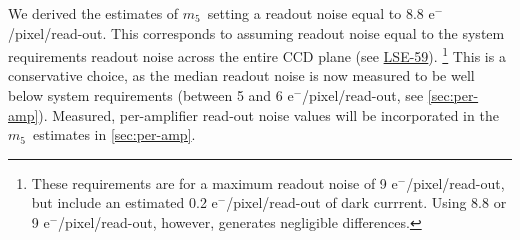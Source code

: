 \documentclass[PST,authoryear,toc]{lsstdoc}
\newcommand{\mf}{\ensuremath{m_5}}
\begin{document}
We derived the estimates of \mf\ setting a readout noise equal to 8.8  e$^-$/pixel/read-out. This corresponds to assuming readout noise equal to the system requirements readout noise across the entire CCD plane (see \href{https://docushare.lsst.org/docushare/dsweb/Get/LSE-59}{{LSE-59}}). \footnote{
These requirements are for a maximum readout noise of 9 e$^-$/pixel/read-out, but include an estimated 0.2  e$^-$/pixel/read-out of dark currrent. Using 8.8 or 9 e$^-$/pixel/read-out, however, generates negligible differences.}
This is a conservative choice, as the median readout noise is now measured to be well below system requirements (between 5 and 6  e$^-$/pixel/read-out, see \autoref{sec:per-amp}). Measured, per-amplifier read-out noise values will be incorporated in the \mf\ estimates in \autoref{sec:per-amp}.
\end{document}
